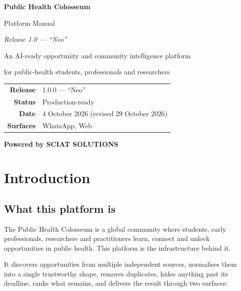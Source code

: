 \documentclass[11pt,a4paper]{report}
\newcommand{\dash}{---}
\begin{document}
\begin{titlepage}
\centering
\vspace*{3cm}
{\Huge\bfseries\color{phcPrimary} Public Health Colosseum\par}
\vspace{6pt}
{\LARGE Platform Manual\par}
\vspace{4pt}
{\large\itshape Release 1.0 \dash{} ``Neo''\par}
\vspace{1.2cm}
{\large An AI-ready opportunity and community intelligence platform\par}
{\large for public-health students, professionals and researchers\par}
\vspace{2.5cm}
\begin{tabular}{rl}
\textbf{Release} & 1.0.0 \dash{} ``Neo'' \\
\textbf{Status} & Production-ready \\
\textbf{Date} & 4 October 2026 (revised 29 October 2026) \\
\textbf{Surfaces} & WhatsApp, Web \\
\end{tabular}
\vfill
{\large\bfseries Powered by SCIAT SOLUTIONS\par}
\vspace{1cm}
\end{titlepage}

\tableofcontents
\clearpage

\chapter{Introduction}

\section{What this platform is}

The Public Health Colosseum is a global community where students, early
professionals, researchers and practitioners learn, connect and unlock
opportunities in public health. This platform is the infrastructure behind it.

It discovers opportunities from multiple independent sources, normalises them
into a single trustworthy shape, removes duplicates, hides anything past its
deadline, ranks what remains, and delivers the result through two surfaces:
\end{document}
